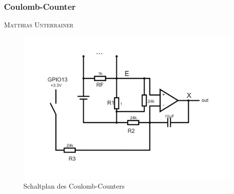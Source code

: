 \documentclass[12pt,a4paper,bibliography=totocnumbered,listof=totocnumbered]{article}
\makeatletter
\newcommand{\chapterauthor}[1]{%
  {\parindent0pt\vspace*{-5pt}%
  \linespread{1.1}\small\scshape#1%
  \par\nobreak\vspace*{3pt}}
  \@afterheading%
}
\makeatother
\begin{document}
\subsubsection{Coulomb-Counter}
\chapterauthor{Matthias Unterrainer}
\begin{figure}[htpb]
    \centering
    \includegraphics[width=0.7\linewidth,keepaspectratio=true]{pics/coulomb_counter_circuit.png}
    \caption{Schaltplan des Coulomb-Counters}
    \label{fig:coulomb_counter}
\end{figure}
\end{document}
